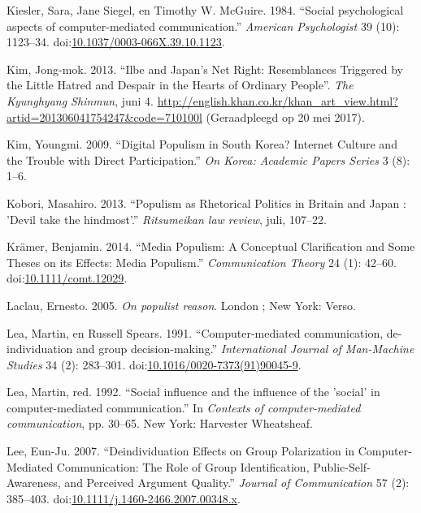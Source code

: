 \documentclass[10.5pt,dutch,]{article}
\begin{document}
\hypertarget{ref-kieslerux5fsocialux5f1984}{}
Kiesler, Sara, Jane Siegel, en Timothy W. McGuire. 1984. “Social
psychological aspects of computer-mediated communication.”  \emph{American
Psychologist} 39 (10): 1123--34.
doi:\href{https://doi.org/10.1037/0003-066X.39.10.1123}{10.1037/0003-066X.39.10.1123}.

\hypertarget{ref-kimux5filbeux5f2013}{}
Kim, Jong-mok. 2013. “Ilbe and Japan’s Net Right: Resemblances Triggered by the Little Hatred and Despair in the Hearts of Ordinary People”. \emph{The Kyunghyang Shinmun}, juni 4.  \url{http://english.khan.co.kr/khan_art_view.html?artid=201306041754247&code=710100l} (Geraadpleegd op 20 mei 2017).

\hypertarget{ref-kimux5fdigitalux5f2009}{}
Kim, Youngmi. 2009. “Digital Populism in South Korea? Internet Culture
and the Trouble with Direct Participation.”  \emph{On Korea: Academic
Papers Series} 3 (8): 1--6.

\hypertarget{ref-koboriux5fpopulismux5f2013}{}
Kobori, Masahiro. 2013. “Populism as Rhetorical Politics in Britain and
Japan : 'Devil take the hindmost'.” \emph{Ritsumeikan law review}, juli,
107--22.

\hypertarget{ref-kramerux5fmediaux5f2014}{}
Krämer, Benjamin. 2014. “Media Populism: A Conceptual Clarification and
Some Theses on its Effects: Media Populism.” \emph{Communication Theory}
24 (1): 42--60. 
doi:\href{https://doi.org/10.1111/comt.12029}{10.1111/comt.12029}.

\hypertarget{ref-laclauux5fpopulistux5f2005}{}
Laclau, Ernesto. 2005. \emph{On populist reason}. London ; New York:
Verso.

\hypertarget{ref-leaux5fcomputer-mediatedux5f1991}{}
Lea, Martin, en Russell Spears. 1991. “Computer-mediated communication,
de-individuation and group decision-making.”  \emph{International Journal
of Man-Machine Studies} 34 (2): 283--301.
doi:\href{https://doi.org/10.1016/0020-7373(91)90045-9}{10.1016/0020-7373(91)90045-9}.

\hypertarget{ref-leaux5fsocialux5f1992}{}
Lea, Martin, red. 1992. “Social influence and the influence of the
'social' in computer-mediated communication.”  In \emph{Contexts of
computer-mediated communication}, pp. 30--65. New York: Harvester
Wheatsheaf.

\hypertarget{ref-leeux5fdeindividuationux5f2007}{}
Lee, Eun-Ju. 2007. “Deindividuation Effects on Group Polarization in
Computer-Mediated Communication: The Role of Group Identification,
Public-Self-Awareness, and Perceived Argument Quality.” \emph{Journal of
Communication} 57 (2): 385--403.
doi:\href{https://doi.org/10.1111/j.1460-2466.2007.00348.x}{10.1111/j.1460-2466.2007.00348.x}.
\end{document}
